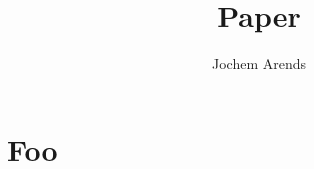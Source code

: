 \documentclass{paper}
\title{Paper}
\author{Jochem Arends}
\begin{document}
\maketitle
\clearpage

\section{Foo}

\lipsum
\end{document}
